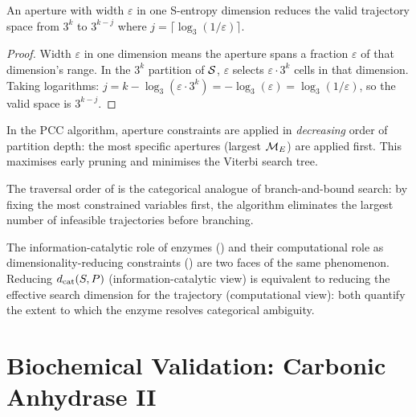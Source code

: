 \begin{theorem}
An aperture with width $\varepsilon$ in one S-entropy dimension reduces the
valid trajectory space from $3^k$ to $3^{k-j}$ where
$j = \lceil\log_3(1/\varepsilon)\rceil$.
\end{theorem}

\begin{proof}
Width $\varepsilon$ in one dimension means the aperture spans a fraction
$\varepsilon$ of that dimension's range.  In the $3^k$ partition of $\mathcal{S}$,
$\varepsilon$ selects $\varepsilon \cdot 3^k$ cells in that dimension.  Taking
logarithms: $j = k - \log_3(\varepsilon \cdot 3^k) = -\log_3(\varepsilon) =
\log_3(1/\varepsilon)$, so the valid space is $3^{k-j}$.
\end{proof}

\begin{definition}
\label{def:traversal-order}
In the PCC algorithm, aperture constraints are applied in \emph{decreasing}
order of partition depth: the most specific apertures (largest $\mathcal{M}_E$)
are applied first.  This maximises early pruning and minimises the Viterbi
search tree.
\end{definition}

The traversal order of  is the categorical analogue
of branch-and-bound search: by fixing the most constrained variables first,
the algorithm eliminates the largest number of infeasible trajectories before
branching.

\begin{proposition}
\label{prop:aperture-info}
The information-catalytic role of enzymes () and their
computational role as dimensionality-reducing constraints
() are two faces of the same phenomenon.  Reducing
$d_{\mathrm{cat}}(S,P)$ (information-catalytic view) is equivalent to reducing the
effective search dimension for the trajectory (computational view): both
quantify the extent to which the enzyme resolves categorical ambiguity.
\end{proposition}

\section{Biochemical Validation: Carbonic Anhydrase II}
\label{sec:poincare-validation}

